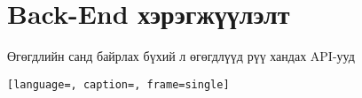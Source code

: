 \appendix
{}



% 

% 

\chapter{Back-End хэрэгжүүлэлт}

\par Өгөгдлийн санд байрлах бүхий л өгөгдлүүд рүү хандах API-ууд
\begin{lstlisting}[language=, caption=, frame=single]
    
\end{lstlisting}